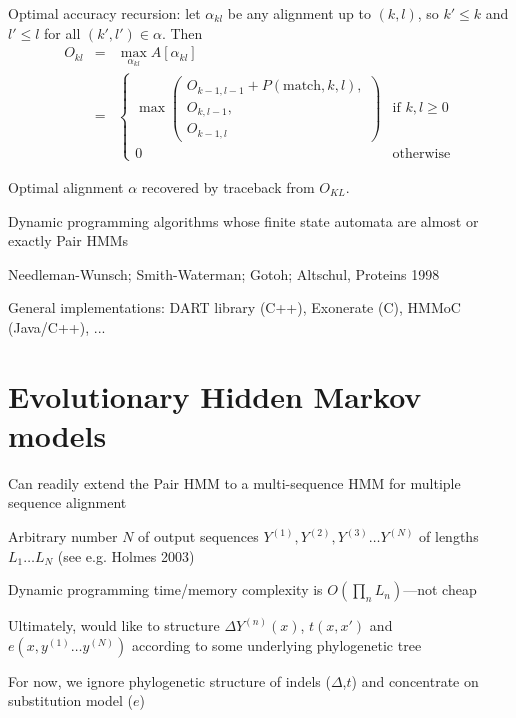 \documentclass{beamer}
\begin{document}
\begin{frame}{}
\itemb
 \item Optimal accuracy recursion: let $\alpha_{kl}$ be any alignment up to $(k,l)$, so $k' \leq k$ and $l' \leq l$ for all $(k',l') \in \alpha$. Then
\begin{eqnarray*}
O_{kl} & = & \max_{\alpha_{kl}} A\left[ \alpha_{kl} \right] \\
& = & \left\{ \begin{array}{ll}
\max \left( \begin{array}{l} O_{k-1,l-1} + P(\mbox{match},k,l), \\ O_{k,l-1}, \\ O_{k-1,l} \end{array} \right) & \mbox{if $k,l \geq 0$} \\
0 & \mbox{otherwise}
\end{array} \right.
\end{eqnarray*}
 \item Optimal alignment $\alpha$ recovered by traceback from $O_{KL}$.
 \iteme

\end{frame}

\begin{frame}{}

\itemb
\item Dynamic programming algorithms whose finite state automata are almost or exactly Pair HMMs
 \itemb
 \item Needleman-Wunsch; Smith-Waterman; Gotoh; Altschul, Proteins 1998
 \item General implementations: DART library (C++), Exonerate (C), HMMoC (Java/C++), ...
 \iteme
\iteme

\end{frame}

\section{Evolutionary Hidden Markov models}
\label{sec:EvolutionaryHMM}

\begin{frame}{}

\itemb
\item Can readily extend the Pair HMM to a multi-sequence HMM for multiple sequence alignment
 \itemb
 \item Arbitrary number $N$ of output sequences $Y^{(1)}, Y^{(2)}, Y^{(3)} \ldots Y^{(N)}$ of lengths $L_1 \ldots L_N$ (see e.g. Holmes 2003)
 \item Dynamic programming time/memory complexity is $O(\prod_n L_n)$---not cheap
 \item Ultimately, would like to structure $\Delta Y^{(n)}(x)$, $t(x,x')$ and $e(x,y^{(1)} \ldots y^{(N)})$ according to some underlying phylogenetic tree
 \item For now, we ignore phylogenetic structure of indels ($\Delta$,$t$) and concentrate on substitution model ($e$)
 \iteme
\iteme
\end{frame}
\end{document}
